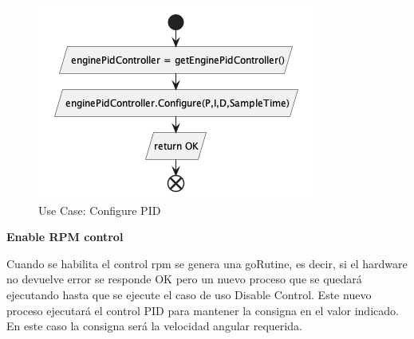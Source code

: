 \begin{figure}[H]
    \centering
    \includegraphics[height=0.2\textheight]{./part/Proyecto_ejecutivo/memoria_descriptiva/descripcionDelProyecto/control/uml/configurePID}
    \caption{Use Case: Configure PID}\label{fig:Use Case-Configure PID}
\end{figure}

\newpage
\textbf{Enable RPM control}

Cuando se habilita el control rpm se genera una goRutine, es decir, si el hardware no devuelve error se responde OK pero un nuevo proceso que se quedará ejecutando hasta que se ejecute el caso de uso Disable Control.
Este nuevo proceso ejecutará el control PID para mantener la consigna en el valor indicado. En este caso la consigna será la velocidad angular requerida.

